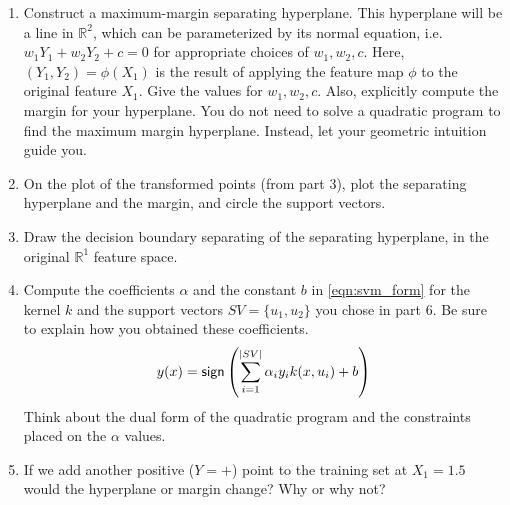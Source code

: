 \begin{enumerate}
\begin{enumerate}
  \item {} Construct a maximum-margin separating hyperplane.
    This hyperplane will be a line in $\mathbb{R}^2$, which can be
    parameterized by its normal equation, i.e. $w_1 Y_1 + w_2 Y_2 + c
    = 0$ for appropriate choices of $w_1,w_2,c$.  Here, $(Y_1,Y_2) =
    \phi(X_1)$ is the result of applying the feature map $\phi$ to the
    original feature $X_1$. Give the values for $w_1, w_2, c$.  Also,
    explicitly compute the margin for your hyperplane.  You do not
    need to solve a quadratic program to find the maximum margin
    hyperplane.  Instead, let your geometric intuition guide you.

  
  \item {} On the plot of the transformed points (from part
    3), plot the separating hyperplane and the margin, and circle the
    support vectors.


  \item {} Draw the decision boundary separating of the
    separating hyperplane, in the original $\mathbb{R}^1$ feature
    space.


  \item {} Compute the coefficients $\alpha$ and the constant
    $b$ in \autoref{eqn:svm_form} for the kernel $k$ and the support
    vectors $SV=\{u_1,u_2\}$ you chose in part 6.  Be sure to explain
    how you obtained these coefficients.
    \begin{eqnarray}
      y(x) = \textsf{sign} \left( \sum_{i=1}^{|SV|} \alpha_i y_i k(x, u_i) + b \right)
      \label{eqn:svm_form}
    \end{eqnarray}
    Think about the dual form of the quadratic program and the
    constraints placed on the $\alpha$ values.


  \item {} If we add another positive ($Y=+$) point to the
    training set at $X_1=1.5$ would the hyperplane or margin change?
    Why or why not?


  \end{enumerate}
  

\end{enumerate}
